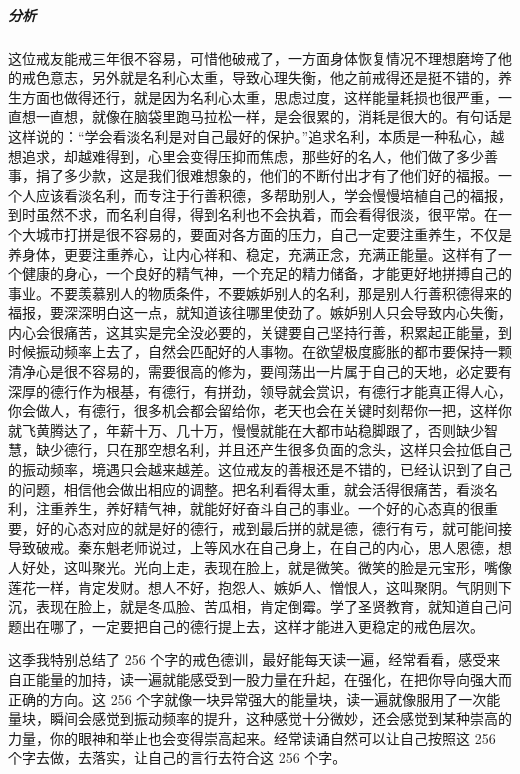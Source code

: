\begin{case}
    \subparagraph{分析} 这位戒友能戒三年很不容易，可惜他破戒了，一方面身体恢复情况不理想磨垮了他的戒色意志，另外就是名利心太重，导致心理失衡，他之前戒得还是挺不错的，养生方面也做得还行，就是因为名利心太重，思虑过度，这样能量耗损也很严重，一直想一直想，就像在脑袋里跑马拉松一样，是会很累的，消耗是很大的。有句话是这样说的：“学会看淡名利是对自己最好的保护。”追求名利，本质是一种私心，越想追求，却越难得到，心里会变得压抑而焦虑，那些好的名人，他们做了多少善事，捐了多少款，这是我们很难想象的，他们的不断付出才有了他们好的福报。一个人应该看淡名利，而专注于行善积德，多帮助别人，学会慢慢培植自己的福报，到时虽然不求，而名利自得，得到名利也不会执着，而会看得很淡，很平常。在一个大城市打拼是很不容易的，要面对各方面的压力，自己一定要注重养生，不仅是养身体，更要注重养心，让内心祥和、稳定，充满正念，充满正能量。这样有了一个健康的身心，一个良好的精气神，一个充足的精力储备，才能更好地拼搏自己的事业。不要羡慕别人的物质条件，不要嫉妒别人的名利，那是别人行善积德得来的福报，要深深明白这一点，就知道该往哪里使劲了。嫉妒别人只会导致内心失衡，内心会很痛苦，这其实是完全没必要的，关键要自己坚持行善，积累起正能量，到时候振动频率上去了，自然会匹配好的人事物。在欲望极度膨胀的都市要保持一颗清净心是很不容易的，需要很高的修为，要闯荡出一片属于自己的天地，必定要有深厚的德行作为根基，有德行，有拼劲，领导就会赏识，有德行才能真正得人心，你会做人，有德行，很多机会都会留给你，老天也会在关键时刻帮你一把，这样你就飞黄腾达了，年薪十万、几十万，慢慢就能在大都市站稳脚跟了，否则缺少智慧，缺少德行，只在那空想名利，并且还产生很多负面的念头，这样只会拉低自己的振动频率，境遇只会越来越差。这位戒友的善根还是不错的，已经认识到了自己的问题，相信他会做出相应的调整。把名利看得太重，就会活得很痛苦，看淡名利，注重养生，养好精气神，就能好好奋斗自己的事业。一个好的心态真的很重要，好的心态对应的就是好的德行，戒到最后拼的就是德，德行有亏，就可能间接导致破戒。秦东魁老师说过，上等风水在自己身上，在自己的内心，思人恩德，想人好处，这叫聚光。光向上走，表现在脸上，就是微笑。微笑的脸是元宝形，嘴像莲花一样，肯定发财。想人不好，抱怨人、嫉妒人、憎恨人，这叫聚阴。气阴则下沉，表现在脸上，就是冬瓜脸、苦瓜相，肯定倒霉。学了圣贤教育，就知道自己问题出在哪了，一定要把自己的德行提上去，这样才能进入更稳定的戒色层次。
\end{case}

这季我特别总结了 256 个字的戒色德训，最好能每天读一遍，经常看看，感受来自正能量的加持，读一遍就能感受到一股力量在升起，在强化，在把你导向强大而正确的方向。这 256 个字就像一块异常强大的能量块，读一遍就像服用了一次能量块，瞬间会感觉到振动频率的提升，这种感觉十分微妙，还会感觉到某种崇高的力量，你的眼神和举止也会变得崇高起来。经常读诵自然可以让自己按照这 256 个字去做，去落实，让自己的言行去符合这 256 个字。

